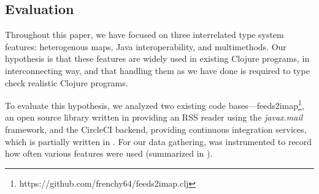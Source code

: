 %
%
%

\subsection{Evaluation}
\label{sec:casestudy}

Throughout this paper, we have focused on three interrelated type
system features: heterogenous maps, Java interoperability, and
multimethods. Our hypothesis is that these features are widely used in
existing Clojure programs, in interconnecting way, and that handling
them as we have done is required to type check realistic Clojure
programs.

To evaluate this hypothesis, we analyzed two existing \coretyped{}
code bases---feeds2imap\footnote{https://github.com/frenchy64/feeds2imap.clj},
an open source library written in \coretyped{}
providing an RSS reader using the \emph{javax.mail} framework, and
the
CircleCI \cite{CircleCI} backend,
providing continuous integration services, which
is partially written in \coretyped{}.
For our data gathering, 
\coretyped{} was instrumented to record how often
various features were used (summarized in 
).

